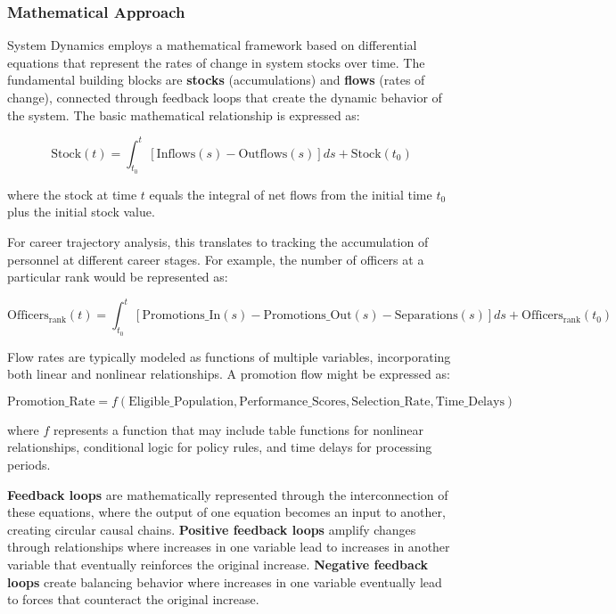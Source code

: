 \documentclass[main.tex]{subfiles}
\begin{document}
\subsubsection{Mathematical Approach}

System Dynamics employs a mathematical framework based on differential equations that represent the rates of change in system stocks over time. The fundamental building blocks are \textbf{stocks} (accumulations) and \textbf{flows} (rates of change), connected through feedback loops that create the dynamic behavior of the system\parencite{systems_analysis}. The basic mathematical relationship is expressed as:

\[
\text{Stock}(t) = \int_{t_0}^{t} [\text{Inflows}(s) - \text{Outflows}(s)] ds + \text{Stock}(t_0)
\]

where the stock at time $t$ equals the integral of net flows from the initial time $t_0$ plus the initial stock value\parencite{sd_wikipedia}.

For career trajectory analysis, this translates to tracking the accumulation of personnel at different career stages. For example, the number of officers at a particular rank would be represented as:

\[
\text{Officers}_{\text{rank}}(t) = \int_{t_0}^{t} [\text{Promotions\_In}(s) - \text{Promotions\_Out}(s) - \text{Separations}(s)] ds + \text{Officers}_{\text{rank}}(t_0)
\]

Flow rates are typically modeled as functions of multiple variables, incorporating both linear and nonlinear relationships. A promotion flow might be expressed as:

\[
\text{Promotion\_Rate} = f(\text{Eligible\_Population}, \text{Performance\_Scores}, \text{Selection\_Rate}, \text{Time\_Delays})
\]

where $f$ represents a function that may include table functions for nonlinear relationships, conditional logic for policy rules, and time delays for processing periods\parencite{sterman_review}.

\textbf{Feedback loops} are mathematically represented through the interconnection of these equations, where the output of one equation becomes an input to another, creating circular causal chains. \textbf{Positive feedback loops} amplify changes through relationships where increases in one variable lead to increases in another variable that eventually reinforces the original increase. \textbf{Negative feedback loops} create balancing behavior where increases in one variable eventually lead to forces that counteract the original increase\parencite{systemdynamics_org,sd_wikipedia}.
\end{document}
